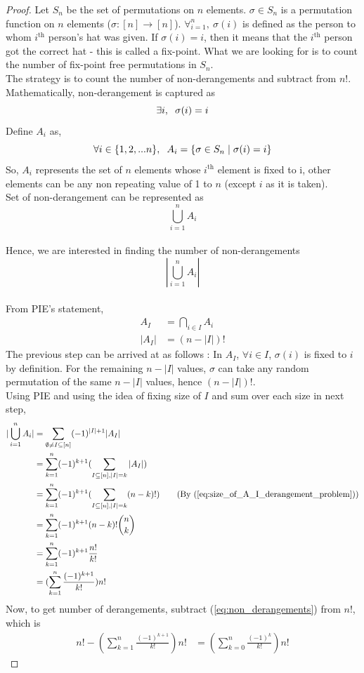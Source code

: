 \begin{proof}
Let $S_n$ be the set of permutations on $n$ elements. $\sigma \in S_n$ is a permutation function on $n$  elements ($\sigma : [n] \rightarrow [n]$). $\forall_{i=1}^{n},~ \sigma(i)$ is defined as the person to whom $i^{\text{th}}$ person's hat was given. If $\sigma(i) = i$, then it means that the $i^{\text{th}}$ person got the correct hat - this is called a fix-point. What we are looking for is to count the number of fix-point free permutations in $S_n$. 
\noindent\\
The strategy is to count the number of non-derangements and subtract from $n!$.
Mathematically, non-derangement is captured as $$\exists i,\hspace{0.2cm} \sigma(i) = i$$ 
Define $A_i$ as, $$\forall i \in \{1,2,...n\},\hspace{0.2cm} A_i = \{\sigma \in S_n\hspace{0.1cm} |\hspace{0.1cm} \sigma(i) = i\}$$ 
So, $A_i$ represents the set of $n$ elements whose $i^{\text{th}}$ element is fixed to i, other elements can be any non repeating value of 1 to $n$ (except $i$ as it is taken).
\\
Set of non-derangement can be represented as $$\bigcup_{i=1}^{n} A_i$$\\
Hence, we are interested in finding the number of non-derangements $$|\bigcup_{i=1}^{n} A_i|$$\\
From PIE's statement,
\begin{align}
A_I &= \bigcap_{i \in I} A_i \nonumber \\
|A_I| &= (n-|I|)! \label{eq:size_of_A_I_derangement_problem}
\end{align}
The previous step can be arrived at as follows : In $A_I$, $\forall i \in I$, $\sigma(i)$ is fixed to $i$ by definition. For the remaining $n-|I|$ values, $\sigma$ can take any random permutation of the same $n-|I|$ values, hence $(n-|I|)!$.\\
Using PIE and using the idea of fixing size of $I$ and sum over each size in next step,
\begin{align}
|\bigcup_{i=1}^{n} A_i| &= \sum_{\emptyset \neq I \subseteq [n]} (-1)^{|I|+1} |A_I|\nonumber \\
&= \sum_{k=1}^{n} (-1)^{k+1} (\sum_{I\subseteq [n],|I|=k} |A_I|)\nonumber \\
&= \sum_{k=1}^{n} (-1)^{k+1} (\sum_{I\subseteq [n],|I|=k} (n-k)!)\nonumber \tag{By (\ref{eq:size_of_A_I_derangement_problem})}\\
&= \sum_{k=1}^{n} (-1)^{k+1} (n-k)! {n \choose k}\nonumber \\
&= \sum_{k=1}^{n} (-1)^{k+1} \frac{n!} {k!}\nonumber \\
&=  (\sum_{k=1}^{n}  \frac{(-1)^{k+1}} {k!})n! \label{eq:non_derangements}
\end{align}
Now, to get number of derangements, subtract (\ref{eq:non_derangements}) from $n!$, which is 
\begin{align*}
n! - (\sum_{k=1}^{n}  \frac{(-1)^{k+1}} {k!})n! &= (\sum_{k=0}^{n} \frac{(-1)^k}{k!})n!
\end{align*}
\end{proof}

